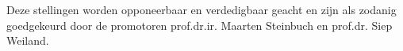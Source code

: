 \documentclass[10pt]{article}%
\begin{document}
\vfill
%
\noindent Deze stellingen worden opponeerbaar en verdedigbaar geacht en zijn als zodanig goedgekeurd door de promotoren 
prof.dr.ir. Maarten Steinbuch en prof.dr. Siep Weiland.
\end{document}

